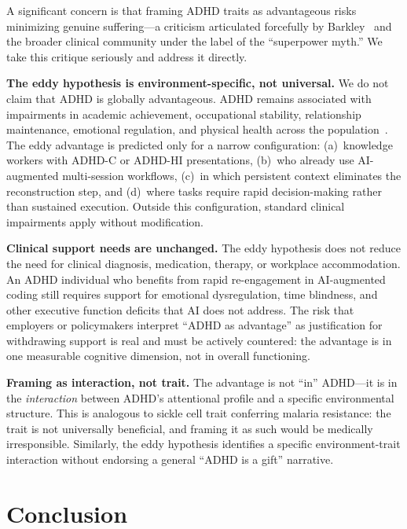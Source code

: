 \documentclass[sigconf,nonacm]{acmart}
\begin{document}
A significant concern is that framing ADHD traits as advantageous risks minimizing genuine suffering---a criticism articulated forcefully by Barkley~\cite{barkley1997} and the broader clinical community under the label of the ``superpower myth.'' We take this critique seriously and address it directly.

\textbf{The eddy hypothesis is environment-specific, not universal.} We do not claim that ADHD is globally advantageous. ADHD remains associated with impairments in academic achievement, occupational stability, relationship maintenance, emotional regulation, and physical health across the population~\cite{cortese2025}. The eddy advantage is predicted only for a narrow configuration: (a)~knowledge workers with ADHD-C or ADHD-HI presentations, (b)~who already use AI-augmented multi-session workflows, (c)~in which persistent context eliminates the reconstruction step, and (d)~where tasks require rapid decision-making rather than sustained execution. Outside this configuration, standard clinical impairments apply without modification.

\textbf{Clinical support needs are unchanged.} The eddy hypothesis does not reduce the need for clinical diagnosis, medication, therapy, or workplace accommodation. An ADHD individual who benefits from rapid re-engagement in AI-augmented coding still requires support for emotional dysregulation, time blindness, and other executive function deficits that AI does not address. The risk that employers or policymakers interpret ``ADHD as advantage'' as justification for withdrawing support is real and must be actively countered: the advantage is in one measurable cognitive dimension, not in overall functioning.

\textbf{Framing as interaction, not trait.} The advantage is not ``in'' ADHD---it is in the \emph{interaction} between ADHD's attentional profile and a specific environmental structure. This is analogous to sickle cell trait conferring malaria resistance: the trait is not universally beneficial, and framing it as such would be medically irresponsible. Similarly, the eddy hypothesis identifies a specific environment-trait interaction without endorsing a general ``ADHD is a gift'' narrative.

\section{Conclusion}
\end{document}
